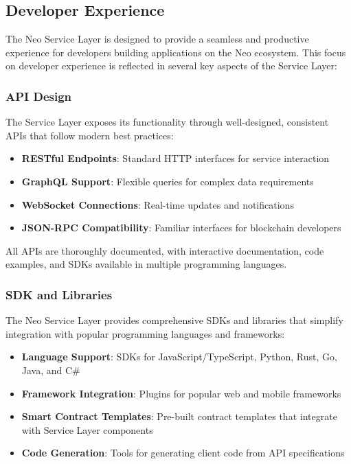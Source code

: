 \documentclass{article}
\begin{document}
\subsection{Developer Experience}
\label{subsec:nsl-developer}

The Neo Service Layer is designed to provide a seamless and productive experience for developers building applications on the Neo ecosystem. This focus on developer experience is reflected in several key aspects of the Service Layer:

\subsubsection{API Design}
\label{subsubsec:api-design}

The Service Layer exposes its functionality through well-designed, consistent APIs that follow modern best practices:

\begin{itemize}
    \item \textbf{RESTful Endpoints}: Standard HTTP interfaces for service interaction
    \item \textbf{GraphQL Support}: Flexible queries for complex data requirements
    \item \textbf{WebSocket Connections}: Real-time updates and notifications
    \item \textbf{JSON-RPC Compatibility}: Familiar interfaces for blockchain developers
\end{itemize}

All APIs are thoroughly documented, with interactive documentation, code examples, and SDKs available in multiple programming languages.

\subsubsection{SDK and Libraries}
\label{subsubsec:sdk-libraries}

The Neo Service Layer provides comprehensive SDKs and libraries that simplify integration with popular programming languages and frameworks:

\begin{itemize}
    \item \textbf{Language Support}: SDKs for JavaScript/TypeScript, Python, Rust, Go, Java, and C\#
    \item \textbf{Framework Integration}: Plugins for popular web and mobile frameworks
    \item \textbf{Smart Contract Templates}: Pre-built contract templates that integrate with Service Layer components
    \item \textbf{Code Generation}: Tools for generating client code from API specifications
\end{itemize}
\end{document}
